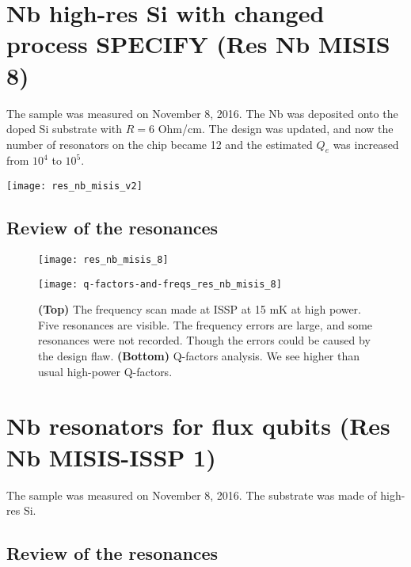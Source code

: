 \documentclass[12pt]{article}
\numberwithin{equation}{section}
\numberwithin{figure}{section}
\begin{document}
\section{Nb high-res Si with changed process SPECIFY (Res Nb MISIS 8)}
\noindent\begin{minipage}{\textwidth}
\begin{minipage}[c]{\dimexpr0.5\textwidth-0.1cm\relax}
The sample was measured on November 8, 2016. The Nb was deposited onto the doped Si substrate with $R=6$ Ohm/cm. The design was updated, and now the number of resonators on the chip became 12 and the estimated $Q_e$ was increased from $10^4$ to $10^5$.
\end{minipage}\hfill
\begin{minipage}[c]{\dimexpr0.5\textwidth-0.1cm\relax}
\centering
\texttt{[image: res\_nb\_misis\_v2]}

\end{minipage}%
\end{minipage}




\subsection{Review of the resonances}

\begin{figure}[h!]
\centering
\texttt{[image: res\_nb\_misis\_8]}

\vspace{0.5cm}
\texttt{[image: q-factors-and-freqs\_res\_nb\_misis\_8]}

\caption{\textbf{(Top)} The frequency scan made at ISSP at 15 mK at high power. Five resonances are visible. The frequency errors are large, and some resonances were not recorded. Though the errors could be caused by the design flaw. \textbf{(Bottom)} Q-factors analysis. We see higher than usual high-power Q-factors.}
\end{figure}

\newpage

\section{Nb resonators for flux qubits (Res Nb MISIS-ISSP 1)}

The sample was measured on November 8, 2016. The substrate was made of high-res Si.

\subsection{Review of the resonances}
\end{document}
